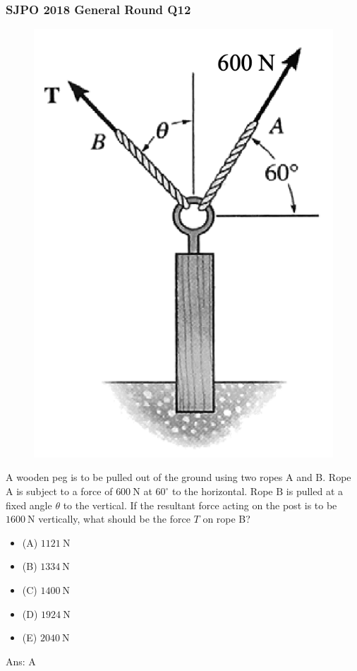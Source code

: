 \documentclass{article}
\begin{document}
\subsubsection{SJPO 2018 General Round Q12}
{
\begin{figure}
\includegraphics[width=1.0\linewidth]{images/sjpo2018q12.png}
\end{figure}
A wooden peg is to be pulled out of the ground using two ropes A and B. Rope $\mathrm{A}$ is subject to a force of $600 \mathrm{~N}$ at $60^{\circ}$ to the horizontal. Rope $\mathrm{B}$ is pulled at a fixed angle $\theta$ to the vertical. If the resultant force acting on the post is to be $1600 \mathrm{~N}$ vertically, what should be the force $T$ on rope B?
\begin{itemize}
\item[] (A) $1121 \mathrm{~N}$
\item[] (B) $1334 \mathrm{~N}$
\item[] (C) $1400 \mathrm{~N}$
\item[] (D) $1924 \mathrm{~N}$
\item[] (E) $2040 \mathrm{~N}$
\end{itemize}
Ans: \ifpaper A \fi
}
\end{document}
